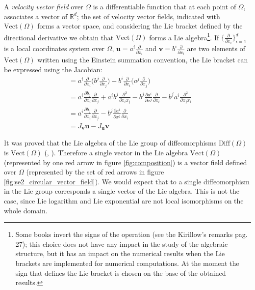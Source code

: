 A \emph{velocity vector field} over $\Omega$ is a differentiable function that at each point of $\Omega$, associates a vector of $\mathbb{R}^d$; the set of velocity vector fields, indicated with $\text{Vect}(\Omega)$ forms a vector space, and considering the Lie bracket defined by the directional derivative
we obtain that $\text{Vect}(\Omega)$ forms a Lie algebra\footnote{
	Some books invert the signs of the operation (see the Kirillow's remarks \cite{kirillov2008introduction} pag. 27); this choice does not have any impact in the study of the algebraic structure, but it has an impact on the numerical results when the Lie brackets are implemented for numerical computations. At the moment the sign that defines the Lie bracket is chosen on the base of the obtained results.
}.
If $\{\frac{\partial}{\partial x_{i}}\}_{i=1}^{d}$ is a local coordinates system over $\Omega$, $\mathbf{u}=a^{i} \frac{\partial}{\partial x_{i}}$ and $\mathbf{v}=b^{i} \frac{\partial}{\partial x_{i}}$ are two elements of  $\text{Vect}(\Omega)$ written using the Einstein summation convention, the Lie bracket can be expressed using the Jacobian:
\begin{align*}
[\mathbf{u}, \mathbf{v}] &= 
a^{i} \frac{\partial}{\partial x_{i}}\big( b^{j} \frac{\partial}{\partial x_{j}} \big)
-
b^{i} \frac{\partial}{\partial x_{i}}\big( a^{j} \frac{\partial}{\partial x_{j}} \big) \\
&=
a^{i} \frac{\partial b_{j}}{\partial x_{i}}\frac{\partial}{\partial x_{j}}  
+ 
a^{i}b^{j}\frac{\partial^{2}}{\partial x_{i}x_{j}}
- 
b^{j} \frac{\partial a^{i}}{\partial x^{j}}\frac{\partial}{\partial x_{i}} 
-
b^{j}a^{i}\frac{\partial^{2}}{\partial x_{j}x_{i}} \\
&=
a^{i} \frac{\partial b_{j}}{\partial x_{i}}\frac{\partial}{\partial x_{j}}
-
b^{j} \frac{\partial a^{i}}{\partial x^{j}}\frac{\partial}{\partial x_{i}} \\
&= 
J_{\mathbf{v}}\mathbf{u} - J_{\mathbf{u}}\mathbf{v}
\end{align*}

It was proved that the Lie algebra of the Lie group of diffeomorphisms $\text{Diff}(\Omega)$ is $\text{Vect}(\Omega)$ (\cite{milnor1982infinite}, \cite{ovsienko1992integrals}). 
Therefore a single vector in the Lie algebra $\text{Vect}(\Omega)$ (represented by one red arrow in figure \ref{fig:composition}) is a vector field defined over $\Omega$ (represented by the set of red arrows in figure \ref{fig:se2_circular_vector_field}). We would expect that to a single diffeomorphism in the Lie group corresponds a single vector of the Lie algebra. This is not the case, since Lie logarithm and Lie exponential are not local isomorphisms on the whole domain.

